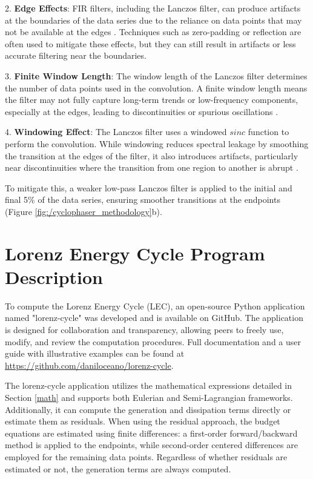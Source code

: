 2. \textbf{Edge Effects}: FIR filters, including the Lanczos filter, can produce artifacts at the boundaries of the data series due to the reliance on data points that may not be available at the edges \citep{oppenheim2009, proakis2006}. Techniques such as zero-padding or reflection are often used to mitigate these effects, but they can still result in artifacts or less accurate filtering near the boundaries.

3. \textbf{Finite Window Length}: The window length of the Lanczos filter determines the number of data points used in the convolution. A finite window length means the filter may not fully capture long-term trends or low-frequency components, especially at the edges, leading to discontinuities or spurious oscillations \citep{smith1997, oppenheim1999discrete}.

4. \textbf{Windowing Effect}: The Lanczos filter uses a windowed $sinc$ function to perform the convolution. While windowing reduces spectral leakage by smoothing the transition at the edges of the filter, it also introduces artifacts, particularly near discontinuities where the transition from one region to another is abrupt \citep{harris1978, mitra2001}.

To mitigate this, a weaker low-pass Lanczos filter is applied to the initial and final 5\% of the data series, ensuring smoother transitions at the endpoints (Figure \ref{fig:/cyclophaser_methodology}b).

\chapter{Lorenz Energy Cycle Program Description}\label{ap02}

To compute the Lorenz Energy Cycle (LEC), an open-source Python application named "lorenz-cycle" was developed and is available on GitHub. The application is designed for collaboration and transparency, allowing peers to freely use, modify, and review the computation procedures. Full documentation and a user guide with illustrative examples can be found at \url{https://github.com/daniloceano/lorenz-cycle}. 

The lorenz-cycle application utilizes the mathematical expressions detailed in Section \ref{math} and supports both Eulerian and Semi-Lagrangian frameworks. Additionally, it can compute the generation and dissipation terms directly or estimate them as residuals. When using the residual approach, the budget equations are estimated using finite differences: a first-order forward/backward method is applied to the endpoints, while second-order centered differences are employed for the remaining data points. Regardless of whether residuals are estimated or not, the generation terms are always computed.

